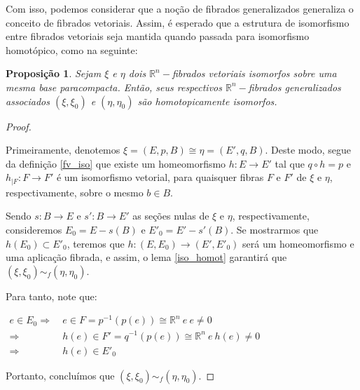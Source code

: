 \documentclass[12pt,oneside]{book} %
\newtheorem{prop}   {\hspace{0.5cm}Proposi\c c\~ao}[chapter]
\newcommand{\R}{\mathbb{R}}
\begin{document}
\par Com isso, podemos considerar que a noção de fibrados generalizados generaliza o conceito de fibrados vetoriais. Assim, é esperado que a estrutura de isomorfismo entre fibrados vetoriais seja mantida quando passada para isomorfismo homotópico, como na seguinte:

\begin{prop}\label{iso_fv_fht}
	Sejam $\xi$ e $\eta$ dois $\R^{n}-$fibrados vetoriais isomorfos sobre uma mesma base paracompacta. Então, seus respectivos $\R^{n}-$fibrados generalizados associados $(\xi,\xi_{0})$ e $(\eta,\eta_{0})$ são homotopicamente isomorfos.
\end{prop}
\begin{proof}
	
	\
	
	\par Primeiramente, denotemos $\xi=(E,p,B)\cong\eta=(E',q,B)$. Deste modo, segue da definição \ref{fv_iso} que existe um homeomorfismo $h:E\to E'$ tal que $q\circ h=p$ e $h_{|F}:F\to F'$ é um isomorfismo vetorial, para quaisquer fibras $F$ e $F'$ de $\xi$ e $\eta$, respectivamente, sobre o mesmo $b\in B$.
	
	\par Sendo $s:B\to E$ e $s':B\to E'$ as seções nulas de $\xi$ e $\eta$, respectivamente, consideremos $E_{0}=E-s(B)$ e $E'_{0}=E'-s'(B)$. Se mostrarmos que $h(E_{0})\subset E'_{0}$, teremos que $h:(E,E_{0})\to (E',E'_{0})$ será um homeomorfismo e uma aplicação fibrada, e assim, o lema \ref{iso_homot} garantirá que $(\xi,\xi_{0})\sim_{f} (\eta,\eta_{0})$.
	
	\par Para tanto, note que: \newline
	
	$\begin{array}{rl}
		e\in E_{0} \Longrightarrow \ & e\in F=p^{-1}(p(e))\cong\R^{n} \ e \ e\neq 0 \\
		\Longrightarrow & h(e)\in F'=q^{-1}(p(e))\cong\R^{n} \ e \ h(e)\neq 0 \\
		\Longrightarrow & h(e)\in E'_{0}
	\end{array}$ \newline
	
	\par Portanto, concluímos que $(\xi,\xi_{0})\sim_{f} (\eta,\eta_{0})$.
	
\end{proof}
\end{document}
